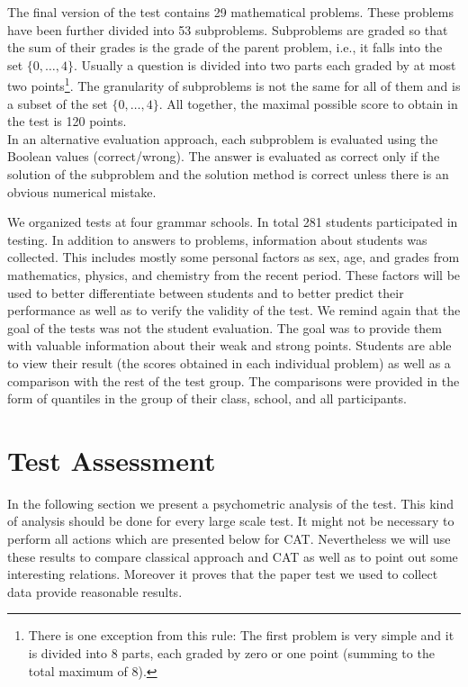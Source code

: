 The final version of the test contains 29 mathematical problems. These problems have been further divided into 53 subproblems. Subproblems are graded so that the sum of their grades is the grade of the parent problem, i.e., it falls into the set $\{0,\ldots,4\}$. Usually a question is divided into two parts each graded by at most two points\footnote{There is one exception from this rule: The first problem is very simple and it is divided into 8 parts, each graded by zero or one point (summing to the total maximum of 8).}. The granularity of subproblems is not the same for all of them and is a subset of the set $\{0,\ldots,4\}$. All together, the maximal possible score to obtain in the test is 120 points. \\
In an alternative evaluation approach, each subproblem is evaluated using the Boolean values (correct/wrong). The answer is evaluated as correct only if the solution of the subproblem and the solution method is correct unless there is an obvious numerical mistake. 

We organized tests at four grammar schools. In total 281 students participated in testing. In addition to answers to problems, information about students was collected. This includes mostly some personal factors as sex, age, and grades from mathematics, physics, and chemistry from the recent period. These factors will be used to better differentiate between students and to better predict their performance as well as to verify the validity of the test. We remind again that the goal of the tests was not the student evaluation. The goal was to provide them with valuable information about their weak and strong points. Students are able to view their result (the scores obtained in each individual problem) as well as a comparison with the rest of the test group. The comparisons were provided in the form of quantiles in the group of their class, school, and all participants.

\section{Test Assessment}
In the following section we present a psychometric analysis of the test. This kind of analysis should be done for every large scale test. It might not be necessary to perform all actions which are presented below for CAT. Nevertheless we will use these results to compare classical approach and CAT as well as to point out some interesting relations. Moreover it proves that the paper test we used to collect data provide reasonable results.


